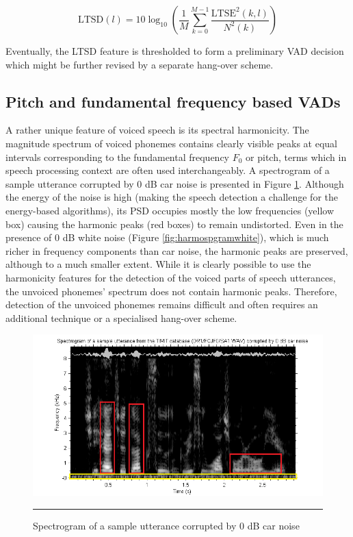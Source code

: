 \begin{equation}
\text{LTSD}(l) = 10 \log_{10} \left ( \frac{1}{M} \sum_{k=0}^{M-1} \frac{\text{LTSE}^{2}(k,l)}{N^{2}(k)} \right )
\label{eq:LTSD}
\end{equation}

Eventually, the LTSD feature is thresholded to form a preliminary VAD decision which might be further revised by a separate hang-over scheme.

\subsection{Pitch and fundamental frequency based VADs}

A rather unique feature of voiced speech is its spectral harmonicity. The magnitude spectrum of voiced phonemes contains clearly visible peaks at equal intervals corresponding to the fundamental frequency $F_0$ or pitch, terms which in speech processing context are often used interchangeably. A spectrogram of a sample utterance corrupted by 0 dB car noise is presented in Figure \ref{fig:harmospgramcar}. Although the energy of the noise is high (making the speech detection a challenge for the energy-based algorithms), its PSD occupies mostly the low frequencies (yellow box) causing the harmonic peaks (red boxes) to remain undistorted. Even in the presence of 0 dB white noise (Figure \ref{fig:harmospgramwhite}), which is much richer in frequency components than car noise, the harmonic peaks are preserved, although to a much smaller extent. While it is clearly possible to use the harmonicity features for the detection of the voiced parts of speech utterances, the unvoiced phonemes' spectrum does not contain harmonic peaks. Therefore, detection of the unvoiced phonemes remains difficult and often requires an additional technique or a specialised hang-over scheme.

\begin{figure}[htbp]
	\centering
		\includegraphics[width=0.9\columnwidth]{Figures/harmospgramcar.png}
		\rule{37em}{0.5pt}
	\caption[Spectrogram of a sample utterance corrupted by 0 dB car noise]{Spectrogram of a sample utterance corrupted by 0 dB car noise}
	\label{fig:harmospgramcar}
\end{figure}

